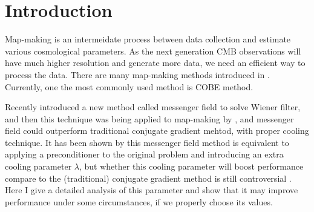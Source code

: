 \documentclass[twocolumn,linenumbers]{aastex631}
\begin{document}
\section{Introduction} \label{sec:intro}


Map-making is an intermeidate process between data collection and estimate
various cosmological parameters.
As the next generation CMB observations will have much higher resolution and 
generate more data, we need an efficient way to process the data.
There are many map-making methods introduced in \cite{1997ApJ...480L..87T}.
Currently, one the most commonly used method is COBE method.

Recently \cite{2013A&A...549A.111E} introduced a new
method called messenger field to solve Wiener filter,
and then this technique was being applied to map-making by
\cite{Huffenberger_2018},
and messenger field could outperform traditional conjugate gradient mehtod, 
with proper cooling technique.
It has been shown by \cite{2018A&A...620A..59P} this messenger field method
is equivalent to applying a preconditioner to the original problem and 
introducing an extra cooling parameter $\lambda$,
but whether this cooling parameter will boost performance compare to
 the (traditional) conjugate gradient method is still controversial . 
Here I give a detailed analysis of this parameter and show that
it may improve performance under some circumstances, if we properly choose
its values.
\end{document}
